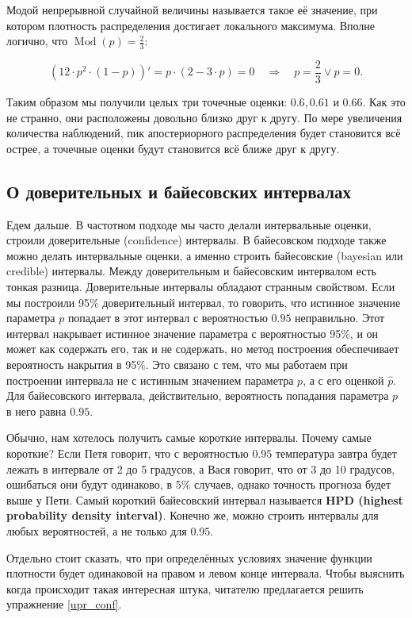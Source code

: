 \documentclass[12pt, a4paper, oneside]{extreport}
\DeclareMathOperator{\Mod}{Mod}
\newcommand{\indef}[1]{\textbf{#1}}     %
\theoremstyle{plain}              %
\theoremstyle{definition}         %
\begin{document}
Модой непрерывной случайной величины называется такое её значение, при котором плотность распределения достигает локального максимума. Вполне логично, что $\Mod(p) = \frac{2}{3}$:

\[ (12 \cdot p^2 \cdot (1-p) )' = p \cdot (2 - 3 \cdot p) = 0 \quad \Rightarrow \quad p = \frac{2}{3} \vee p = 0.\]

Таким образом мы получили целых три точечные оценки: $0.6, 0.61$ и $0.66$. Как это не странно, они расположены довольно близко друг к другу. По мере увеличения количества наблюдений, пик апостериорного распределения будет становится всё острее, а точечные оценки будут становится всё ближе друг к другу.

\subsection*{О доверительных и байесовских интервалах}

Едем дальше. В частотном подходе мы часто делали интервальные оценки, строили доверительные (confidence) интервалы. В байесовском подходе также можно делать интервальные оценки, а именно строить байесовские (bayesian или credible) интервалы. Между доверительным и байесовским интервалом есть тонкая разница. Доверительные интервалы обладают странным свойством. Если мы построили 95\% доверительный интервал, то говорить, что истинное значение параметра $p$ попадает в этот интервал с вероятностью $0.95$ неправильно. Этот интервал накрывает истинное значение параметра с вероятностью 95\%, и он может как содержать его, так и не содержать, но метод построения обеспечивает вероятность накрытия в 95\%. Это связано с тем, что мы работаем при построении интервала не с истинным значением параметра $p$, а с его оценкой $\hat p$. Для байесовского интервала, действительно, вероятность попадания параметра $p$ в него равна $0.95$.

Обычно, нам хотелось получить самые короткие интервалы. Почему самые короткие? Если Петя говорит, что с вероятностью $0.95$ температура завтра будет лежать в интервале от 2 до 5 градусов, а Вася говорит, что от 3 до 10 градусов, ошибаться они будут одинаково, в 5\% случаев, однако точность прогноза будет выше у Пети. Самый короткий байесовский интервал называется \indef{HPD (highest probability density interval)}. Конечно же, можно строить интервалы для любых вероятностей, а не только для $0.95$. 

Отдельно стоит сказать, что при определённых условиях значение функции плотности будет одинаковой на правом и левом конце интервала. Чтобы выяснить когда происходит такая интересная штука, читателю предлагается решить упражнение \ref{upr_conf}.
\end{document}

